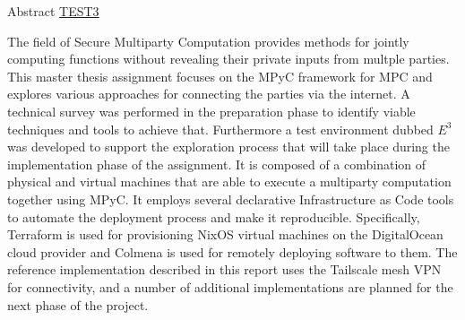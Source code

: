 \begin{frame}{Abstract}
\protect\hypertarget{abstract}{}
\href{prep/010-introduction.md\#background}{TEST3}

The field of Secure Multiparty Computation provides methods for jointly
computing functions without revealing their private inputs from multple
parties. This master thesis assignment focuses on the MPyC framework for
MPC and explores various approaches for connecting the parties via the
internet. A technical survey was performed in the preparation phase to
identify viable techniques and tools to achieve that. Furthermore a test
environment dubbed \(E^3\) was developed to support the exploration
process that will take place during the implementation phase of the
assignment. It is composed of a combination of physical and virtual
machines that are able to execute a multiparty computation together
using MPyC. It employs several declarative Infrastructure as Code tools
to automate the deployment process and make it reproducible.
Specifically, Terraform is used for provisioning NixOS virtual machines
on the DigitalOcean cloud provider and Colmena is used for remotely
deploying software to them. The reference implementation described in
this report uses the Tailscale mesh VPN for connectivity, and a number
of additional implementations are planned for the next phase of the
project.

\tableofcontents

\printnoidxglossary[type=\acronymtype,title=List of Abbreviations]
\listoffigures

\mainmatter
\end{frame}

